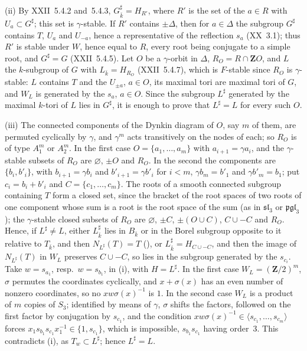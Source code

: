 \textup{(ii)} By XXII~5.4.2 and~5.4.3, \(G^\sharp_{\bar k}=H_{R'}\), where \(R'\) is the set of the \(a\in R\)
with \(U_a\subset G^\sharp\); this set is \(\gamma\)-stable. If \(R'\) contains \(\pm\Delta\), then for
\(a\in\Delta\) the subgroup \(G^\sharp\) contains \(T\), \(U_a\) and \(U_{-a}\), hence a representative of the
reflection \(s_a\) \textup{(XX~3.1)}; thus \(R'\) is stable under \(W\), hence equal to \(R\), every root being
conjugate to a simple root, and \(G^\sharp=G\) \textup{(XXII~5.4.5)}. Let \(O\) be a \(\gamma\)-orbit in
\(\Delta\), \(R_O=R\cap\mathbf ZO\), and \(L\) the \(k\)-subgroup of \(G\) with \(L_{\bar k}=H_{R_O}\)
\textup{(XXII~5.4.7)}, which is \(F\)-stable since \(R_O\) is \(\gamma\)-stable: \(L\) contains \(T\) and the
\(U_{\pm a}\), \(a\in O\), its maximal tori are maximal tori of \(G\), and \(W_L\) is generated by the \(s_a\),
\(a\in O\). Since the subgroup \(L^\sharp\) generated by the maximal \(k\)-tori of \(L\) lies in \(G^\sharp\), it
is enough to prove that \(L^\sharp=L\) for every such \(O\).

\textup{(iii)} The connected components of the Dynkin diagram of \(O\), say \(m\) of them, are permuted
cyclically by \(\gamma\), and \(\gamma^m\) acts transitively on the nodes of each; so \(R_O\) is of type
\(A_1^m\) or \(A_2^m\). In the first case \(O=\{a_1,\ldots,a_m\}\) with \(a_{i+1}=\gamma a_i\), and the
\(\gamma\)-stable subsets of \(R_O\) are \(\varnothing\), \(\pm O\) and \(R_O\). In the second the components are
\(\{b_i,b'_i\}\), with \(b_{i+1}=\gamma b_i\) and \(b'_{i+1}=\gamma b'_i\) for \(i<m\), \(\gamma b_m=b'_1\) and
\(\gamma b'_m=b_1\); put \(c_i=b_i+b'_i\) and \(C=\{c_1,\ldots,c_m\}\). The roots of a smooth connected subgroup
containing \(T\) form a closed set, since the bracket of the root spaces of two roots of one component whose sum
is a root is the root space of the sum (as in \(\mathfrak{sl}_3\) or \(\mathfrak{pgl}_3\)); the
\(\gamma\)-stable closed subsets of \(R_O\) are \(\varnothing\), \(\pm C\), \(\pm(O\cup C)\), \(C\cup-C\) and
\(R_O\). Hence, if \(L^\sharp\neq L\), either \(L^\sharp_{\bar k}\) lies in \(B_{\bar k}\) or in the Borel
subgroup opposite to it relative to \(T_{\bar k}\), and then \(N_{L^\sharp}(T)=T\)
\textup{()}, or \(L^\sharp_{\bar k}=H_{C\cup-C}\), and then the image of
\(N_{L^\sharp}(T)\) in \(W_L\) preserves \(C\cup-C\), so lies in the subgroup generated by the \(s_{c_i}\). Take
\(w=s_{a_1}\), resp.\ \(w=s_{b_1}\), in (i), with \(H=L^\sharp\). In the first case \(W_L=(\mathbf Z/2)^m\),
\(\sigma\) permutes the coordinates cyclically, and \(x+\sigma(x)\) has an even number of nonzero coordinates, so
no \(xw\sigma(x)^{-1}\) is \(1\). In the second case \(W_L\) is a product of \(m\) copies of \(S_3\);
identified by means of \(\gamma\), \(\sigma\) shifts the factors, followed on the first factor by conjugation by
\(s_{c_1}\), and the condition \(xw\sigma(x)^{-1}\in\langle s_{c_1},\ldots,s_{c_m}\rangle\) forces
\(x_1s_{b_1}s_{c_1}x_1^{-1}\in\{1,s_{c_1}\}\), which is impossible, \(s_{b_1}s_{c_1}\) having order~\(3\). This
contradicts (i), as \(T_w\subset L^\sharp\); hence \(L^\sharp=L\).

